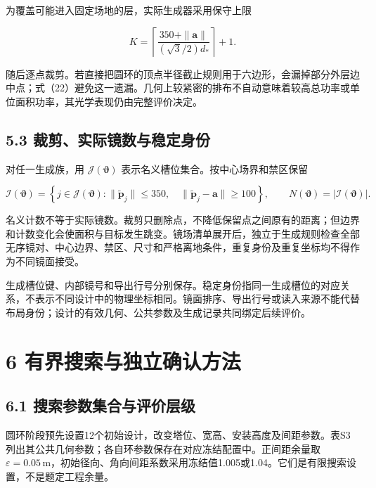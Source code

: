 \documentclass[UTF8,fontset=windows,zihao=-4]{ctexart}
\begin{document}
\par\noindent\begin{minipage}{\linewidth}
为覆盖可能进入固定场地的层，实际生成器采用保守上限

\[
K=\left\lceil
\frac{350+\|\boldsymbol a\|}{(\sqrt3/2)d_*}
\right\rceil+1.
\tag{22}
\]
\end{minipage}\par

随后逐点裁剪。若直接把圆环的顶点半径截止规则用于六边形，会漏掉部分外层边中点；式（22）避免这一遗漏。几何上较紧密的排布不自动意味着较高总功率或单位面积功率，其光学表现仍由完整评价决定。

\subsection*{5.3 裁剪、实际镜数与稳定身份}

\par\noindent\begin{minipage}{\linewidth}
对任一生成族，用 \(\mathcal J(\boldsymbol\vartheta)\) 表示名义槽位集合。按中心场界和禁区保留

\[
\mathcal I(\boldsymbol\vartheta)=
\left\{j\in\mathcal J(\boldsymbol\vartheta):
\|\widetilde{\boldsymbol p}_j\|\le350,
\quad\|\widetilde{\boldsymbol p}_j-\boldsymbol a\|\ge100
\right\},
\qquad N(\boldsymbol\vartheta)=|\mathcal I(\boldsymbol\vartheta)|.
\tag{23}
\]
\end{minipage}\par

名义计数不等于实际镜数。裁剪只删除点，不降低保留点之间原有的距离；但边界和计数变化会使面积与目标发生跳变。镜场清单展开后，独立于生成规则检查全部无序镜对、中心边界、禁区、尺寸和严格离地条件，重复身份及重复坐标均不得作为不同镜面接受。

生成槽位键、内部镜号和导出行号分别保存。稳定身份指同一生成槽位的对应关系，不表示不同设计中的物理坐标相同。镜面排序、导出行号或读入来源不能代替布局身份；设计的有效几何、公共参数及生成记录共同绑定后续评价。

\section*{6 有界搜索与独立确认方法}

\subsection*{6.1 搜索参数集合与评价层级}

圆环阶段预先设置12个初始设计，改变塔位、宽高、安装高度及间距参数。表S3列出其公共几何参数；各自环参数保存在对应冻结配置中。正间距余量取 \(\varepsilon=0.05\,\mathrm m\)，初始径向、角向间距系数采用冻结值1.005或1.04。它们是有限搜索设置，不是题定工程余量。
\end{document}
